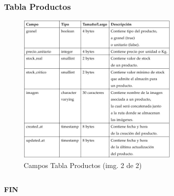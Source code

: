 \documentclass{beamer}
\begin{document}
\begin{frame}
\frametitle{Tabla Productos}
\begin{figure}
\includegraphics[width=0.7\textwidth]{images/tabla_productos2.jpg}
\caption{Campos Tabla Productos \tiny{(img. 2 de 2)}}
\end{figure}
\end{frame}

\subsection{}
\begin{frame}
\begin{center}
\huge{\textbf{FIN}}
\end{center}
\end{frame}
\end{document}
